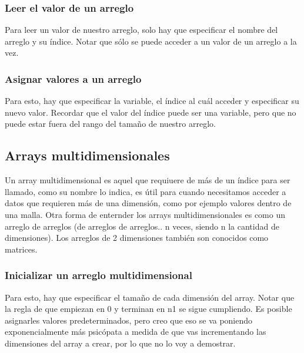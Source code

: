 \documentclass[letterpaper,10pt,spanish]{sphinxmanual}
\begin{document}
\subsubsection{Leer el valor de un arreglo}
\label{\detokenize{edd/lineales:leer-el-valor-de-un-arreglo}}
Para leer un valor de nuestro arreglo, solo hay que especificar el nombre del arreglo y su índice. Notar que sólo se puede acceder a un valor de un arreglo a la vez.

\begin{sphinxVerbatim}[commandchars=\\\{\},numbers=left,firstnumber=1,stepnumber=1]
    \PYG{p}{[}\PYG{p}{]}
\end{sphinxVerbatim}


\subsubsection{Asignar valores a un arreglo}
\label{\detokenize{edd/lineales:asignar-valores-a-un-arreglo}}
Para esto, hay que especificar la variable, el índice al cuál acceder y especificar su nuevo valor. Recordar que el valor del índice puede ser una variable, pero que no puede estar fuera del rango del tamaño de nuestro arreglo.

\begin{sphinxVerbatim}[commandchars=\\\{\},numbers=left,firstnumber=1,stepnumber=1]
    \PYG{p}{[}\PYG{p}{]}  
\end{sphinxVerbatim}


\subsection{Arrays multidimensionales}
\label{\detokenize{edd/lineales:arrays-multidimensionales}}
Un array multidimensional es aquel que requiuere de más de un índice para ser llamado, como su nombre lo indica, es útil para cuando necesitamos acceder a datos que requieren más de una dimensión, como por ejemplo valores dentro de una malla. Otra forma de enternder los arrays multidimensionales es como un arreglo de arreglos (de arreglos de arreglos.. n veces, siendo n la cantidad de dimensiones). Los arreglos de 2 dimensiones también son conocidos como matrices.


\subsubsection{Inicializar un arreglo multidimensional}
\label{\detokenize{edd/lineales:inicializar-un-arreglo-multidimensional}}
Para esto, hay que especificar el tamaño de cada dimensión del array. Notar que la regla de que empiezan en 0 y terminan en n\sphinxhyphen{}1 se sigue cumpliendo. Es posible asignarles valores predeterminados, pero creo que eso se va poniendo exponencialmente más psicópata a medida de que vas incrementando las dimensiones del array a crear, por lo que no lo voy a demostrar.
\end{document}
